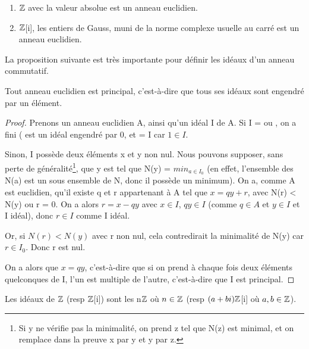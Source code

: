 \documentclass[a4paper, 12pt]{article}
\begin{document}
\begin{exemple}
	\begin{enumerate}
		\item $\mathbb{Z}$ avec la valeur absolue est un anneau euclidien.
		\item $\mathbb{Z}$[i], les entiers de Gauss, muni de la norme complexe
			usuelle au carré est un anneau euclidien.
	\end{enumerate}
\end{exemple}

La proposition suivante est très importante pour définir les idéaux d'un anneau
commutatif.

\begin{proposition}
	Tout anneau euclidien est principal, c'est-à-dire que tous ses idéaux sont
	engendré par un élément.
\end{proposition}

\begin{proof}
	Prenons un anneau euclidien A, ainsi qu'un idéal I de A. Si I = 
	ou , on a fini ( est un idéal engendré par 0, et
	 = I car $1 \in I$.

	Sinon, I possède deux éléments x et y non nul. Nous pouvons supposer, sans
	perte de généralité\footnote{Si y ne vérifie pas la minimalité, on prend z
	tel que N(z) est minimal, et on remplace dans la preuve x par y et y par
z.}, que y est tel que N(y) = $\displaystyle min_{a \in I_{0}}$ (en
effet, l'ensemble des N(a) est un sous ensemble de N, donc il possède un
minimum).
	On a, comme A est euclidien, qu'il existe q et r appartenant à A tel que $x
	= qy + r$, avec N(r) < N(y) ou r = 0.
	On a alors $r = x - qy$ avec $x \in I$, $qy \in I$ (comme $q \in A$ et $y
	\in I$ et I idéal), donc $r \in I$ comme I idéal.
	
	Or, si $N(r) < N(y)$ avec r non nul, cela contredirait la minimalité de N(y)
	car $r \in I_{0}$. Donc r est nul.

	On a alors que $x = qy$, c'est-à-dire que si on prend à chaque fois deux
	éléments quelconques de I, l'un est multiple de l'autre, c'est-à-dire que
	I est principal.
\end{proof}

\begin{corollary}
	Les idéaux de $\mathbb{Z}$ (resp $\mathbb{Z}$[i]) sont les n$\mathbb{Z}$ où $n \in
	\mathbb{Z}$ (resp $(a+bi) \mathbb{Z}$[i] où $a, b \in \mathbb{Z}$).
\end{corollary}
\end{document}
